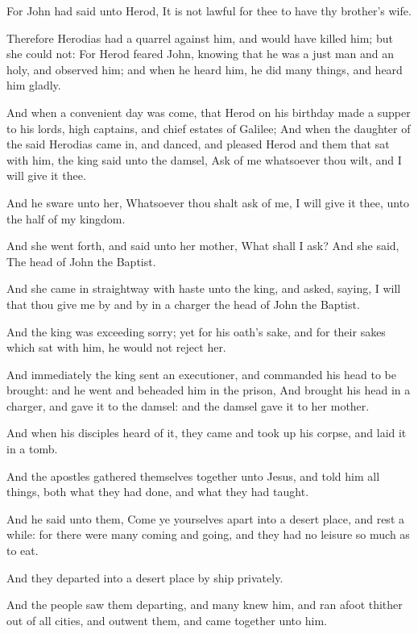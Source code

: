 \verse For John had said unto Herod, It is not lawful for thee to have thy brother's wife.

\verse Therefore Herodias had a quarrel against him, and would have killed him; but she could not: \verse For Herod feared John, knowing that he was a just man and an holy, and observed him; and when he heard him, he did many things, and heard him gladly.

\verse And when a convenient day was come, that Herod on his birthday made a supper to his lords, high captains, and chief estates of Galilee; \verse And when the daughter of the said Herodias came in, and danced, and pleased Herod and them that sat with him, the king said unto the damsel, Ask of me whatsoever thou wilt, and I will give it thee.

\verse And he sware unto her, Whatsoever thou shalt ask of me, I will give it thee, unto the half of my kingdom.

\verse And she went forth, and said unto her mother, What shall I ask?  And she said, The head of John the Baptist.

\verse And she came in straightway with haste unto the king, and asked, saying, I will that thou give me by and by in a charger the head of John the Baptist.

\verse And the king was exceeding sorry; yet for his oath's sake, and for their sakes which sat with him, he would not reject her.

\verse And immediately the king sent an executioner, and commanded his head to be brought: and he went and beheaded him in the prison, \verse And brought his head in a charger, and gave it to the damsel: and the damsel gave it to her mother.

\verse And when his disciples heard of it, they came and took up his corpse, and laid it in a tomb.

\verse And the apostles gathered themselves together unto Jesus, and told him all things, both what they had done, and what they had taught.

\verse And he said unto them, Come ye yourselves apart into a desert place, and rest a while: for there were many coming and going, and they had no leisure so much as to eat.

\verse And they departed into a desert place by ship privately.

\verse And the people saw them departing, and many knew him, and ran afoot thither out of all cities, and outwent them, and came together unto him.

